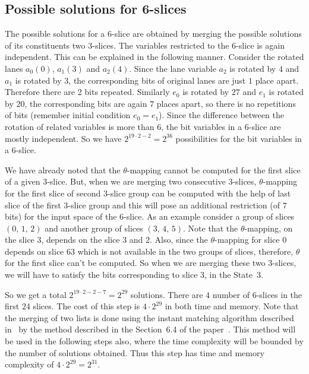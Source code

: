 \subsection{Possible solutions for  6-slices}
The possible solutions for a $6$-slice are obtained by merging the possible solutions of its constituents two $3$-slices. The variables restricted to the $6$-slice is again independent. This can be explained in the following manner. Consider the rotated lanes $a_0(0)$, $a_1(3)$ and $a_2(4)$. Since the lane variable $a_2$ is rotated by $4$ and $a_1$ is rotated by $3$, the corresponding bits of original lanes are just $1$ place apart. Therefore there are 2 bits repeated. Similarly $e_0$ is rotated by $27$ and $e_1$ is rotated by $20$, the corresponding bits are again $7$ places apart, so there is no repetitions of bits (remember initial condition $e_0 = e_1$). Since the difference between the rotation of related variables is more than $6$, the bit variables in a $6$-slice are mostly independent.
So we have $2^{19\cdot 2 - 2}= 2^{36}$ possibilities for the bit variables in a $6$-slice. 

We have already noted that the $\theta$-mapping cannot be computed for the first slice of a given $3$-slice. But, when we are merging two consecutive $3$-slices, $\theta$-mapping for the first slice of second $3$-slice group can be computed with the help of last slice of the first $3$-slice group and this will pose an additional restriction (of $7$ bits) for the input space of the $6$-slice.
As an example consider a group of slices $(0,\,1,\,2)$ and another group of slices $(3,\,4,\,5)$. Note that the $\theta$-mapping, on the slice $3$, depends on the slice $3$ and $2$. Also, since the $\theta$-mapping for slice $0$ depends on slice $63$ which is not available in the two groups of slices, therefore, $\theta$ for the first slice can't be computed. So when we are merging these two $3$-slices, we will have to satisfy the bits corresponding to slice $3$, in the State~3. 

So we get a total $2^{19\cdot 2 - 2 - 7} = 2^{29}$ solutions. There are $4$ number of $6$-slices in the first $24$ slices.
The cost of this step is $4 \cdot 2^{29}$ in both time and memory. Note that the merging of two lists is done using the instant matching algorithm described in~\cite{naya2011improve} by the method described in the Section~6.4 of the paper~\cite{naya2011practical}. This method will be used in the following steps also, where the time complexity will be bounded by the number of solutions obtained. Thus this step has time and memory complexity of $4 \cdot 2^{29} = 2^{31}$.

